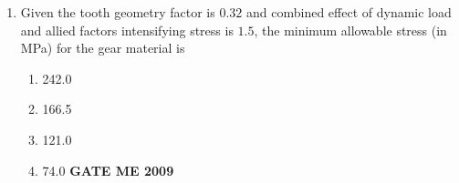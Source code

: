 \documentclass[journal]{IEEEtran}
\begin{document}
\begin{enumerate}[leftmargin=0pt]
\item Given the tooth geometry factor is $0.32$ and combined effect of dynamic load and allied factors intensifying stress is $1.5$, the minimum allowable stress (in MPa) for the gear material is
\begin{enumerate}[label=(\Alph*)]
  \item 242.0
  \item 166.5
  \item 121.0
  \item 74.0
\hfill{\textbf{GATE ME 2009}}
\end{enumerate}



\end{enumerate}
\end{document}
